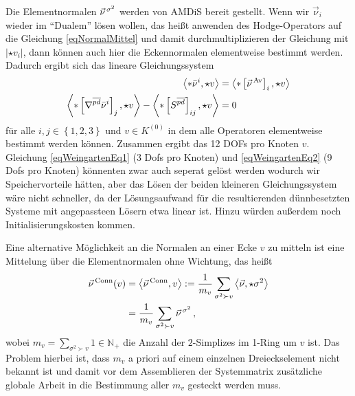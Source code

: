     Die Elementnormalen \( \vec{\nu}^{\,\sigma^{2}} \) werden von AMDiS bereit gestellt.
    Wenn wir \( \vec{\nu}_{i} \) wieder im "`Dualem"' lösen wollen, das heißt anwenden des Hodge-Operators auf die Gleichung
    \eqref{eqNormalMittel} und damit durchmultiplizieren der Gleichung mit \( \left| \star v_{i} \right| \), dann können auch hier die
    Eckennormalen elementweise bestimmt werden.
    Dadurch ergibt sich das lineare Gleichungssystem
    \begin{align}
        \label{eqWeingartenEq1}
        \left\langle *\bar{\nu}^{i} , \star v \right\rangle 
                &= \left\langle *\left[ \vec{\nu}^{\,\text{Av}} \right]_{i}, \star v \right\rangle \\
        \label{eqWeingartenEq2}
        \left\langle *\left[ \nabla^{\overline{pd}}\bar{\nu}^{i} \right]_{j} , \star v \right\rangle
            - \left\langle *\left[ S^{\overline{pd}} \right]_{ij} , \star v \right\rangle 
                &= 0
    \end{align}
    für alle \( i,j\in\left\{ 1,2,3 \right\} \) und \( v\in K^{(0)} \) in dem alle Operatoren elementweise bestimmt werden können.
    Zusammen ergibt das 12 DOFs pro Knoten \( v \).
    Gleichung \eqref{eqWeingartenEq1} (3 Dofs pro Knoten) und \eqref{eqWeingartenEq2} (9 Dofs pro Knoten) 
    könnenten zwar auch seperat gelöst werden wodurch wir
    Speichervorteile hätten, aber das Lösen der beiden kleineren Gleichungssystem wäre nicht schneller, da der Lösungsaufwand für die
    resultierenden dünnbesetzten Systeme mit angepassteen Lösern etwa linear ist.
    Hinzu würden außerdem noch Initialisierungskosten kommen.

    Eine alternative Möglichkeit an die Normalen an einer Ecke \( v \) zu mitteln ist eine Mittelung über die Elementnormalen ohne
    Wichtung, das heißt
    \begin{align}
      \label{eqNormalConnMittel}
      \begin{aligned}
      \vec{\nu}^{\,\text{Conn}}(v) &= \left\langle \vec{\nu}^{\,\text{Conn}}, v \right\rangle 
          := \frac{1}{m_{v}} \sum_{\sigma^{2}\succ v}
                      \left\langle \vec{\nu}, \star\sigma^{2} \right\rangle \\
          &= \frac{1}{m_{v}} \sum_{\sigma^{2}\succ v}
                                          \vec{\nu}^{\,\sigma^{2}} \,\text{,}
     \end{aligned}
    \end{align}
    wobei \( m_{v} = \sum_{\sigma^{2}\succ v} 1 \in \mathds{N}_{+}\) die Anzahl der \( 2 \)-Simplizes im 1-Ring um \( v \) ist.
    Das Problem hierbei ist, dass \( m_{v} \) a priori auf einem einzelnen Dreieckselement nicht bekannt ist und damit vor dem Assemblieren
    der Systemmatrix zusätzliche globale Arbeit in die Bestimmung aller \( m_{v} \) gesteckt werden muss.
    
